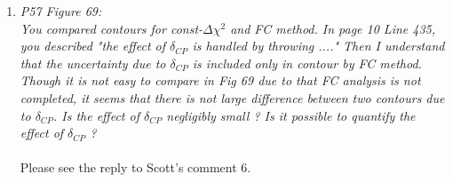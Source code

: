 \begin{enumerate}
  \vspace{5 mm}
\item
  {\em
    P57 Figure 69:\\
    You compared contours for const-$\Delta\chi^2$ and FC method. In page 10 Line 435, you described
    "the effect of $\delta_{CP}$ is handled by throwing ...."  Then I understand that the uncertainty
    due to $\delta_{CP}$ is included only in contour by FC method.
    Though it is not easy to compare in Fig 69 due to that FC analysis is not completed, it seems that
    there is not large difference between two contours due to $\delta_{CP}$. Is the effect of $\delta_{CP}$
    negligibly small ? Is it possible to quantify the effect of $\delta_{CP}$ ?
  }\\
  \\
  Please see the reply to Scott's comment 6.
  




\end{enumerate}

